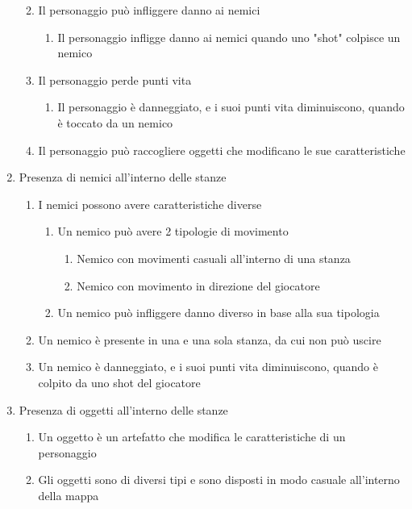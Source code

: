 \begin{enumerate}
\begin{enumerate}
\begin{enumerate}
        \end{enumerate}
        \item Il personaggio può infliggere danno ai nemici
        \begin{enumerate}
            \item Il personaggio infligge danno ai nemici quando uno "shot" colpisce un nemico
        \end{enumerate}
        \item Il personaggio perde punti vita
        \begin{enumerate}
            \item Il personaggio è danneggiato, e i suoi punti vita diminuiscono, quando è toccato da un nemico
        \end{enumerate}
        \item Il personaggio può raccogliere oggetti che modificano le sue caratteristiche
    \end{enumerate}
    \item Presenza di nemici all'interno delle stanze
    \begin{enumerate}
        \item I nemici possono avere caratteristiche diverse
        \begin{enumerate}
            \item Un nemico può avere 2 tipologie di movimento
            \begin{enumerate}
                \item Nemico con movimenti casuali all'interno di una stanza
                \item Nemico con movimento in direzione del giocatore
            \end{enumerate}
            \item Un nemico può infliggere danno diverso in base alla sua tipologia
        \end{enumerate}
        \item Un nemico è presente in una e una sola stanza, da cui non può uscire
        \item Un nemico è danneggiato, e i suoi punti vita diminuiscono, quando è colpito da uno shot del giocatore
    \end{enumerate}
    \item Presenza di oggetti all'interno delle stanze
    \begin{enumerate}
        \item Un oggetto è un artefatto che modifica le caratteristiche di un personaggio
        \item Gli oggetti sono di diversi tipi e sono disposti in modo casuale all'interno della mappa
    \end{enumerate}
\end{enumerate}


